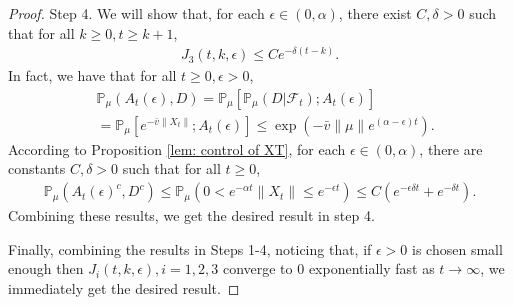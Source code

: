 \documentclass[12pt,a4paper]{amsart}
\theoremstyle{plain}
\theoremstyle{definition}
\numberwithin{equation}{section}
\begin{document}
\begin{proof}
    Step 4. We will show that, for each $\epsilon\in (0,  \alpha)$, there exist $C,\delta>0$ such that for all $k\geq0, t\geq k+1$,
\begin{equation}\begin{split}\label{ineq: control of J3}
 J_3(t,k,\epsilon)\leq Ce^{-\delta (t-k)}.
\end{split}\end{equation}
    In fact, we have that for all $t\geq 0, \epsilon >0$,
\begin{equation}\begin{split}
    &\mathbb P_{\mu}(A_{t}(\epsilon), D) = \mathbb P_{\mu}[\mathbb P_{\mu}(D|\mathscr F_t);A_t(\epsilon)]
    \\&= \mathbb P_\mu[e^{-\bar v\|X_t\|};A_t(\epsilon)]
    \leq \exp({-\bar v \|\mu\|e^{(\alpha - \epsilon)t}}).
\end{split}\end{equation}
According to Proposition \ref{lem: control of XT}, for each $\epsilon \in (0, \alpha)$, there are constants $C, \delta>0$ such that
for all $t\geq 0$,
\begin{equation}\begin{split}
    \mathbb P_\mu(A_t(\epsilon)^c,D^c) \leq   \mathbb P_\mu(0 < e^{-\alpha t}\|X_t\|\leq e^{ - \epsilon t}) \leq C (e^{-\epsilon \delta t}+e^{-\delta t}).
\end{split}\end{equation}
    Combining these results, we get the desired result in step 4.

    Finally, combining the results in Steps 1-4, noticing that, if $\epsilon>0$ is chosen small enough then $J_{i}(t,k,\epsilon), i = 1,2,3$ converge to $0$ exponentially fast as $t\rightarrow\infty$,
we immediately get the desired result.
\end{proof}
\end{document}
